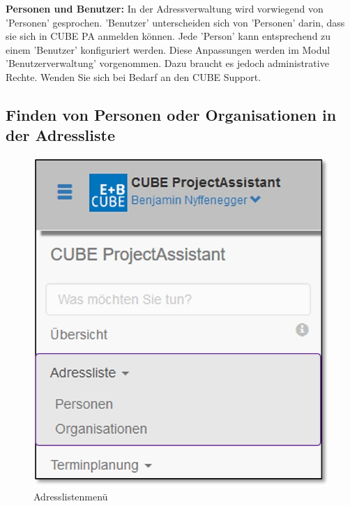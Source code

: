 \textbf{Personen und Benutzer:} In der Adressverwaltung wird vorwiegend von 'Personen' gesprochen. 'Benutzer' unterscheiden sich von 'Personen' darin, dass sie sich in CUBE PA anmelden können. Jede 'Person' kann entsprechend zu einem 'Benutzer' konfiguriert werden. Diese Anpassungen werden im Modul 'Benutzerverwaltung' vorgenommen. Dazu braucht es jedoch administrative Rechte. Wenden Sie sich bei Bedarf an den CUBE Support.

\pagebreak
\subsection{Finden von Personen oder Organisationen in der Adressliste}

\begin{figure}   %
  \vspace{-35pt}      %
  \begin{center}
    \includegraphics[width=1\linewidth]{../chapters/03_Adressliste/pictures/3-1_Menu_Adressliste.jpg}
  \end{center}
  \vspace{-20pt}
  \caption{Adresslistenmenü}
  \vspace{-10pt}
\end{figure}

